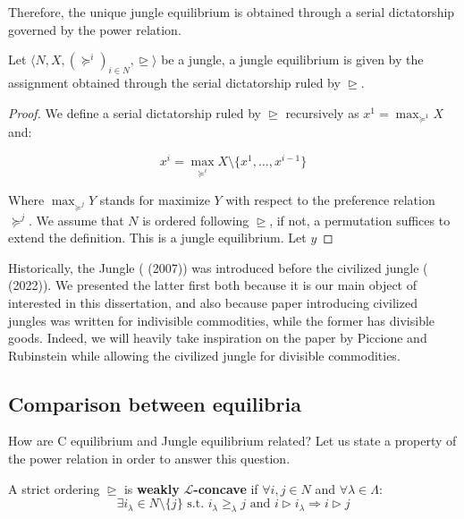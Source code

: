 Therefore, the unique jungle equilibrium is obtained through a serial dictatorship governed by the power relation. 

\begin{proposition}
    Let $\langle N,X,(\succeq^i)_{i\in N}, \trianglerighteq\rangle$ be a jungle, a jungle equilibrium is given by the assignment obtained through the serial dictatorship ruled by $\trianglerighteq$.

    \begin{proof}
        We define a serial dictatorship ruled by $\trianglerighteq$ recursively as $x^1=\max_{\succeq^1}X$ and:

        \[x^i=\max_{\succeq^i}X\setminus\{x^1,\dots,x^{i-1}\}\]

        Where $\max_{\succeq^j}Y$ stands for maximize $Y$ with respect to the preference relation $\succeq^j$. We assume that $N$ is ordered following $\trianglerighteq$, if not, a permutation suffices to extend the definition. This is a jungle equilibrium. Let $y$ 
    \end{proof}
\end{proposition}

Historically, the Jungle (\cite[PR]{P-R} (2007)) was introduced before the civilized jungle (\cite[RY]{RY} (2022)). We presented the latter first both because it is our main object of interested in this dissertation, and also because paper introducing civilized jungles was written for indivisible commodities, while the former has divisible goods. Indeed, we will heavily take inspiration on the paper by Piccione and Rubinstein while allowing the civilized jungle for divisible commodities. 

\subsection{Comparison between equilibria}

How are C equilibrium and Jungle equilibrium related? Let us state a property of the power relation in order to answer this question. 

\begin{definition}
    A strict ordering $\trianglerighteq$ is \textbf{weakly} $\mathcal{L}$\textbf{-concave} if $\forall i,j\in N$ and $\forall\lambda\in\Lambda$:
    \[\exists i_{\lambda}\in N\setminus\{j\} \text{ s.t. } i_{\lambda}\geq_{\lambda}j \text{ and } i\triangleright i_{\lambda} \Rightarrow i\triangleright j\]
\end{definition}

